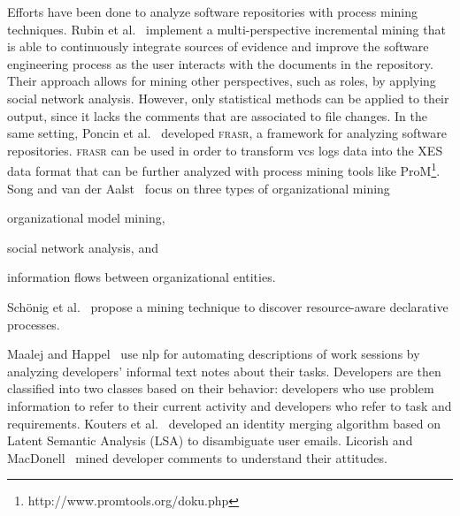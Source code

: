 Efforts have been done to analyze software repositories with process mining techniques. Rubin et al.~\cite{rubin2007process} implement a multi-perspective incremental mining that is able to continuously integrate sources of evidence and improve the software engineering process as the user interacts with the documents in the repository. Their approach allows for mining other perspectives, such as roles, by applying social network analysis. However, only statistical methods can be applied to their output, since it lacks the comments that are associated to file changes. In the same setting, Poncin et al.~\cite{Poncin2011} developed \textsc{frasr}, a framework for analyzing software repositories. \textsc{frasr} can be used in order to transform \gls*{vcs} logs data into the XES~\cite{verbeek2010xes} data format that can be further analyzed with process mining tools like ProM\footnote{http://www.promtools.org/doku.php}. 
Song and van der Aalst~\cite{Song2008} focus on three types of organizational mining 
\begin{inparaenum}[\itshape i)]
   \item organizational model mining, 
   \item social network analysis, and 
   \item information flows between organizational entities.
\end{inparaenum} Schönig et al.~\cite{Schonig2015} propose a mining technique to discover resource-aware declarative processes.

Maalej and Happel~\cite{Maalej2010} use \gls*{nlp} for automating descriptions of work sessions by analyzing developers' informal text notes about their tasks. Developers are then classified into two classes based on their behavior: developers who use problem information to refer to their current activity and developers who refer to task and requirements. Kouters et al.~\cite{Kouters2012} developed an identity merging algorithm based on Latent Semantic Analysis (LSA) to disambiguate user emails. Licorish and MacDonell~\cite{Licorish2014} mined developer comments to understand their attitudes.

